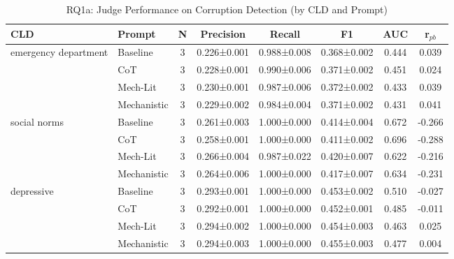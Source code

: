 \begin{table}[htbp]
\centering
\caption{RQ1a: Judge Performance on Corruption Detection (by CLD and Prompt)}
\label{tab:rq1a_main}
\begin{tabular}{llcccccc}
\toprule
\textbf{CLD} & \textbf{Prompt} & \textbf{N} & \textbf{Precision} & \textbf{Recall} & \textbf{F1} & \textbf{AUC} & \textbf{r$_{pb}$} \\
\midrule
emergency department & Baseline & 3 & 0.226±0.001 & 0.988±0.008 & 0.368±0.002 & 0.444 & 0.039 \\
 & CoT & 3 & 0.228±0.001 & 0.990±0.006 & 0.371±0.002 & 0.451 & 0.024 \\
 & Mech-Lit & 3 & 0.230±0.001 & 0.987±0.006 & 0.372±0.002 & 0.433 & 0.039 \\
 & Mechanistic & 3 & 0.229±0.002 & 0.984±0.004 & 0.371±0.002 & 0.431 & 0.041 \\
\midrule
social norms & Baseline & 3 & 0.261±0.003 & 1.000±0.000 & 0.414±0.004 & 0.672 & -0.266 \\
 & CoT & 3 & 0.258±0.001 & 1.000±0.000 & 0.411±0.002 & 0.696 & -0.288 \\
 & Mech-Lit & 3 & 0.266±0.004 & 0.987±0.022 & 0.420±0.007 & 0.622 & -0.216 \\
 & Mechanistic & 3 & 0.264±0.006 & 1.000±0.000 & 0.417±0.007 & 0.634 & -0.231 \\
\midrule
depressive & Baseline & 3 & 0.293±0.001 & 1.000±0.000 & 0.453±0.002 & 0.510 & -0.027 \\
 & CoT & 3 & 0.292±0.001 & 1.000±0.000 & 0.452±0.001 & 0.485 & -0.011 \\
 & Mech-Lit & 3 & 0.294±0.002 & 1.000±0.000 & 0.454±0.003 & 0.463 & 0.025 \\
 & Mechanistic & 3 & 0.294±0.003 & 1.000±0.000 & 0.455±0.003 & 0.477 & 0.004 \\
\midrule
\bottomrule
\end{tabular}
\end{table}